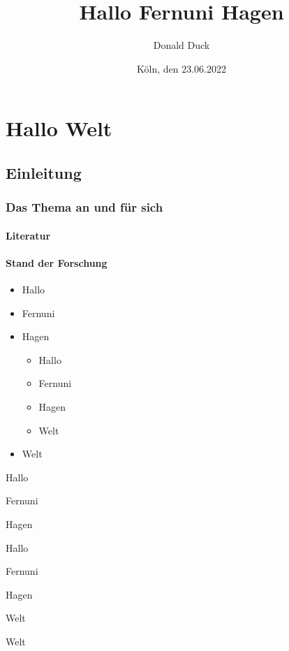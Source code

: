 \documentclass[12pt,ngerman,parskip=half]{scrreprt}
\author{Donald Duck}
\title{Hallo Fernuni Hagen}
\date{Köln, den 23.06.2022}
\begin{document}
\maketitle

\tableofcontents

\listoffigures

\chapter{Hallo Welt}

\section{Einleitung}
\subsection{Das Thema an und für sich}
\subsubsection{Literatur}

\blindtext[1] 

\subsubsection{Stand der Forschung}

\blindtext[1] 


\begin{itemize} %
\item Hallo
\item Fernuni
\item Hagen
\begin{itemize}[+]
\item Hallo
\item Fernuni
\item Hagen
\item Welt
\end{itemize}
\item Welt
\end{itemize}

\begin{compactitem}[\%] %
\item Hallo
\item Fernuni
\item Hagen
\begin{compactitem}[+]
\item Hallo
\item Fernuni
\item Hagen
\item Welt
\end{compactitem}
\item Welt
\end{compactitem}
\end{document}
